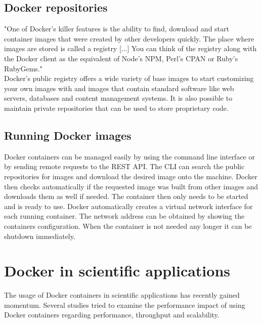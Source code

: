 \documentclass[conference]{IEEEtran}
\begin{document}
\subsection{Docker repositories}
"One of Docker's killer features is the ability to find, download and start container images that were created by other developers quickly. The place where images are stored is called a registry [...] You can think of the registry along with the Docker client as the equivalent of Node's NPM, Perl's CPAN or Ruby's RubyGems." \cite{Merkel2014}\\

Docker's public registry offers a wide variety of base images to start customizing your own images with and images that contain standard software like web servers, databases and content management systems. It is also possible to maintain private repositories that can be used to store proprietary code. 

\subsection{Running Docker images}
Docker containers can be managed easily by using the command line interface or by sending remote requests to the REST API. The CLI can search the public repositories for images and download the desired image onto the machine. Docker then checks automatically if the requested image was built from other images and downloads them as well if needed. The container then only needs to be started and is ready to use. Docker automatically creates a virtual network interface for each running container. The network address can be obtained by showing the containers configuration. When the container is not needed any longer it can be shutdown immediately. \cite{Merkel2014, DockerWeb}\\

\section{Docker in scientific applications}
The usage of Docker containers in scientific applications has recently gained momentum. Several studies tried to examine the performance impact of using Docker containers regarding performance, throughput and scalability.\\
\end{document}
